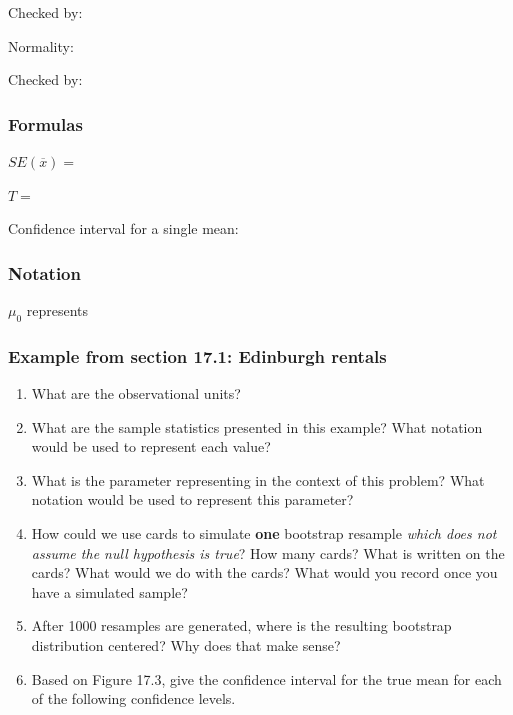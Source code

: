 \documentclass[
]{report}
\newcommand{\rgs}{\vspace{12pt}} %
\newcommand{\rgi}{\hspace{24pt}}  %
\begin{document}
\rgi \rgi Checked by:
\rgs 

\rgi Normality:
\rgs 

\rgi \rgi Checked by:
\rgs 

\hypertarget{formulas-1}{%
\subsubsection*{Formulas}\label{formulas-1}}

\(SE(\overline{x})=\)
\rgs 

\(T=\)
\rgs 

Confidence interval for a single mean:
\rgs 

\hypertarget{notation}{%
\subsubsection*{Notation}\label{notation}}

\(\mu_0\) represents
\rgs 

\hypertarget{example-from-section-17.1-edinburgh-rentals}{%
\subsubsection*{Example from section 17.1: Edinburgh rentals}\label{example-from-section-17.1-edinburgh-rentals}}

\begin{enumerate}
\def\labelenumi{\arabic{enumi}.}
\item
  What are the observational units?
  \rgs 
\item
  What are the sample statistics presented in this example? What notation would be used to represent each value?
  \rgs 
\item
  What is the parameter representing in the context of this problem? What notation would be used to represent this parameter?
  \rgs 
  \rgs 
\item
  How could we use cards to simulate \textbf{one} bootstrap resample \emph{which does not assume the null hypothesis is true}? How many cards? What is written on the cards? What would we do with the cards? What would you record once you have a simulated sample?
  \rgs 
  \rgs 
  \rgs 
\item
  After 1000 resamples are generated, where is the resulting bootstrap distribution centered? Why does that make sense?
  \rgs 
  \rgs 
\item
  Based on Figure 17.3, give the confidence interval for the true mean for each of the following confidence levels.
\end{enumerate}
\end{document}
